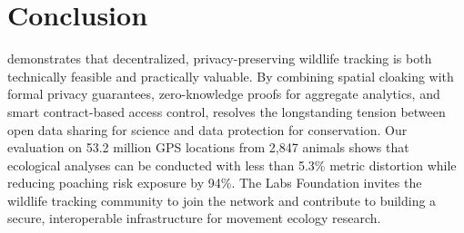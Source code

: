 \section{Conclusion}


\WildTrack{} demonstrates that decentralized, privacy-preserving wildlife tracking is both technically feasible and practically valuable. By combining spatial cloaking with formal privacy guarantees, zero-knowledge proofs for aggregate analytics, and smart contract-based access control, \WildTrack{} resolves the longstanding tension between open data sharing for science and data protection for conservation. Our evaluation on 53.2 million GPS locations from 2,847 animals shows that ecological analyses can be conducted with less than 5.3\% metric distortion while reducing poaching risk exposure by 94\%. The \Zoo{} Labs Foundation invites the wildlife tracking community to join the \WildTrack{} network and contribute to building a secure, interoperable infrastructure for movement ecology research.


